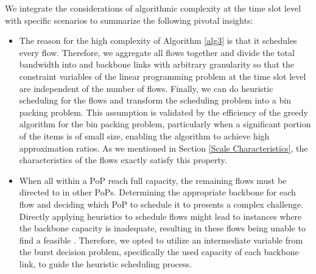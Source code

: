 

 We integrate the considerations of algorithmic complexity at the time slot level with specific scenarios to summarize the following pivotal insights:

\begin{itemize}
\item {} The reason for the high complexity of Algorithm \ref{alg3} is that it schedules every flow. Therefore, we aggregate all flows together and divide the total bandwidth into {\egress} and backbone links with arbitrary granularity so that the constraint variables of the linear programming problem at the time slot level are independent of the number of flows. Finally, we can do heuristic scheduling for the flows and transform the scheduling problem into a bin packing problem. This assumption is validated by the efficiency of the greedy algorithm for the bin packing problem, particularly when a significant portion of the items is of small size, enabling the algorithm to achieve high approximation ratios. As we mentioned in Section \ref{Scale Characteristics}, the characteristics of the flows exactly satisfy this property.
\item {} When all {\egresses} within a PoP reach full capacity, the remaining flows must be directed to {\egresses} in other PoPs. Determining the appropriate backbone for each flow and deciding which PoP to schedule it to presents a complex challenge. Directly applying heuristics to schedule flows might lead to instances where the backbone capacity is inadequate, resulting in these flows being unable to find a feasible {\egress}. Therefore, we opted to utilize an intermediate variable from the burst decision problem, specifically the used capacity of each backbone link, to guide the heuristic scheduling process.
\end{itemize}

